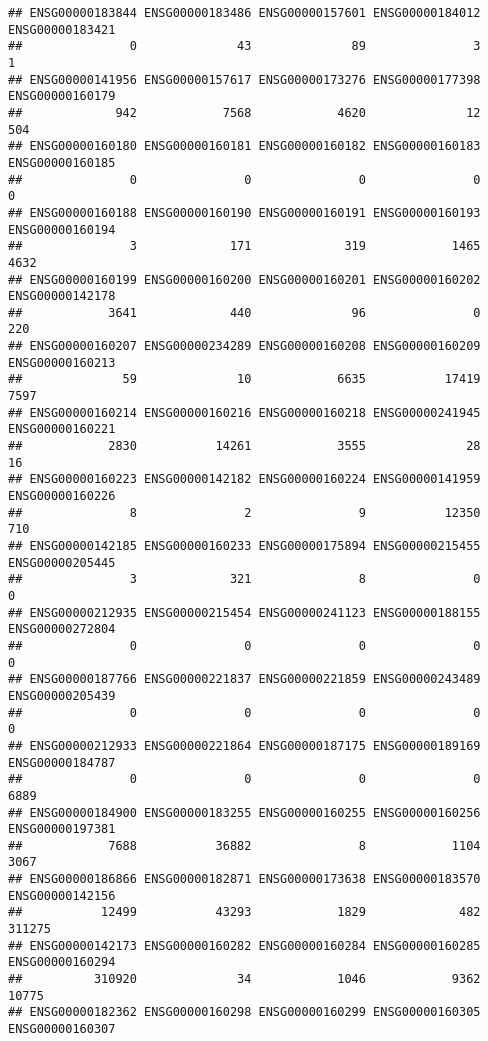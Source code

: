 \documentclass[
]{article}
\begin{document}
\begin{verbatim}
## ENSG00000183844 ENSG00000183486 ENSG00000157601 ENSG00000184012 ENSG00000183421 
##               0              43              89               3               1 
## ENSG00000141956 ENSG00000157617 ENSG00000173276 ENSG00000177398 ENSG00000160179 
##             942            7568            4620              12             504 
## ENSG00000160180 ENSG00000160181 ENSG00000160182 ENSG00000160183 ENSG00000160185 
##               0               0               0               0               0 
## ENSG00000160188 ENSG00000160190 ENSG00000160191 ENSG00000160193 ENSG00000160194 
##               3             171             319            1465            4632 
## ENSG00000160199 ENSG00000160200 ENSG00000160201 ENSG00000160202 ENSG00000142178 
##            3641             440              96               0             220 
## ENSG00000160207 ENSG00000234289 ENSG00000160208 ENSG00000160209 ENSG00000160213 
##              59              10            6635           17419            7597 
## ENSG00000160214 ENSG00000160216 ENSG00000160218 ENSG00000241945 ENSG00000160221 
##            2830           14261            3555              28              16 
## ENSG00000160223 ENSG00000142182 ENSG00000160224 ENSG00000141959 ENSG00000160226 
##               8               2               9           12350             710 
## ENSG00000142185 ENSG00000160233 ENSG00000175894 ENSG00000215455 ENSG00000205445 
##               3             321               8               0               0 
## ENSG00000212935 ENSG00000215454 ENSG00000241123 ENSG00000188155 ENSG00000272804 
##               0               0               0               0               0 
## ENSG00000187766 ENSG00000221837 ENSG00000221859 ENSG00000243489 ENSG00000205439 
##               0               0               0               0               0 
## ENSG00000212933 ENSG00000221864 ENSG00000187175 ENSG00000189169 ENSG00000184787 
##               0               0               0               0            6889 
## ENSG00000184900 ENSG00000183255 ENSG00000160255 ENSG00000160256 ENSG00000197381 
##            7688           36882               8            1104            3067 
## ENSG00000186866 ENSG00000182871 ENSG00000173638 ENSG00000183570 ENSG00000142156 
##           12499           43293            1829             482          311275 
## ENSG00000142173 ENSG00000160282 ENSG00000160284 ENSG00000160285 ENSG00000160294 
##          310920              34            1046            9362           10775 
## ENSG00000182362 ENSG00000160298 ENSG00000160299 ENSG00000160305 ENSG00000160307 

\end{verbatim}
\end{document}
